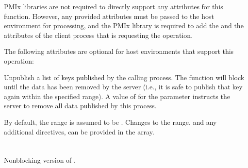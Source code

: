 \returnsimple

\reqattrstart
\ac{PMIx} libraries are not required to directly support any attributes for this function. However, any provided attributes must be passed to the host environment for processing, and the \ac{PMIx} library is required to add the  and the  attributes of the client process that is requesting the operation.

\reqattrend

\optattrstart
The following attributes are optional for host environments that support this operation:


\optattrend

\descr

Unpublish a list of keys published by the calling process.
The function will block until the data has been removed by the server (i.e., it is safe to publish that key again within the specified range).
A value of  for the  parameter instructs the server to remove all data published by this process.

By default, the range is assumed to be .
Changes to the range, and any additional directives, can be provided in the  array.


\section{}

\summary

Nonblocking version of .

\format


\begin{arglist}
\end{arglist}

